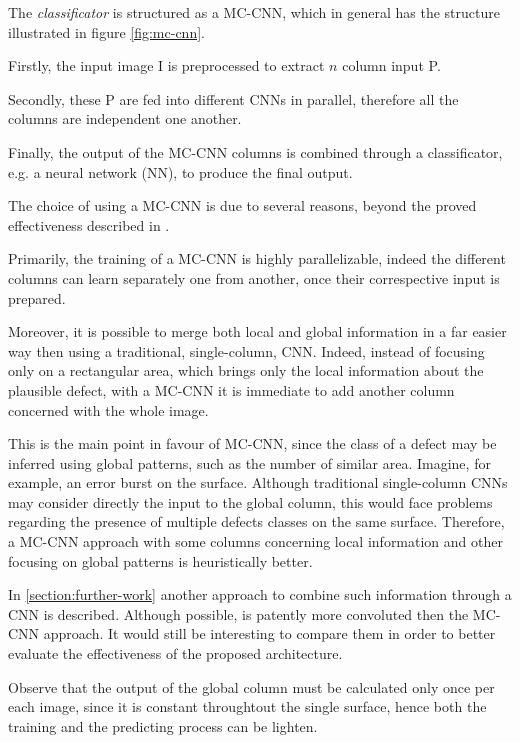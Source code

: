     \par{
        The \emph{classificator} is structured as a MC-CNN, which in general has the structure illustrated in figure \ref{fig:mc-cnn}. 
    }
    \par{
        Firstly, the input image I is preprocessed to extract $n$ column input P.
    }
    \par{
        Secondly, these P are fed into different CNNs in parallel, therefore all the columns are independent one another. 
    }
    \par{
        Finally, the output of the MC-CNN columns is combined through a classificator, e.g. a neural network (NN), to produce the final output.
    }
    \par{
        The choice of using a MC-CNN is due to several reasons, beyond the proved effectiveness described in \cite{ieee:6248110}.
    }
    \par{
        Primarily, the training of a MC-CNN is highly parallelizable, indeed the different columns can learn separately one from another, once their correspective input is prepared.
    }
    \par{
        Moreover, it is possible to merge both local and global information in a far easier way then using a traditional, single-column, CNN. Indeed, instead of focusing only on a rectangular area, which brings only the local information about the plausible defect, with a MC-CNN it is immediate to add another column concerned with the whole image.
    }
    \par{
        This is the main point in favour of MC-CNN, since the class of a defect may be inferred using global patterns, such as the number of similar area. Imagine, for example, an error burst on the surface. Although traditional single-column CNNs may consider directly the input to the global column, this would face problems regarding the presence of multiple defects classes on the same surface. Therefore, a MC-CNN approach with some columns concerning local information and other focusing on global patterns is heuristically better.
    }
    \par{
        In \ref{section:further-work} another approach to combine such information through a CNN is described. Although possible, is patently more convoluted then the MC-CNN approach. It would still be interesting to compare them in order to better evaluate the effectiveness of the proposed architecture. 
    }
    \par{
        Observe that the output of the global column must be calculated only once per each image, since it is constant throughtout the single surface, hence both the training and the predicting process can be lighten.
    }
